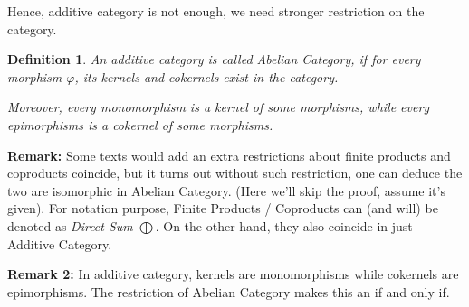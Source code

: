 \documentclass[x11names,reqno,12pt]{extarticle}
\newtheorem{defn}{Definition}
\begin{document}
\hfil

Hence, additive category is not enough, we need stronger restriction on the category.

\begin{defn}
    An additive category is called \emph{Abelian Category}, if for every morphism $\varphi$, its kernels and cokernels exist in the category.

    Moreover, every monomorphism is a kernel of some morphisms, while every epimorphisms is a cokernel of some morphisms.
\end{defn}
\textbf{Remark:} Some texts would add an extra restrictions about finite products and coproducts coincide, but it turns out without such restriction, one can deduce the two are isomorphic in Abelian Category. (Here we'll skip the proof, assume it's given). For notation purpose, Finite Products / Coproducts can (and will) be denoted as \emph{Direct Sum} $\bigoplus$. On the other hand, they also coincide in just Additive Category.

\textbf{Remark 2:} In additive category, kernels are monomorphisms while cokernels are epimorphisms. The restriction of Abelian Category makes this an if and only if.

\hfil
\end{document}
